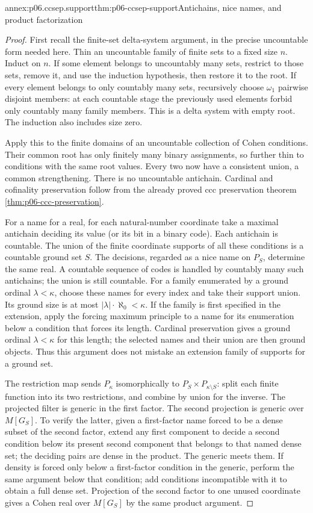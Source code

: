 \begin{annexitem}{annex:p06.ccsep.support}{thm:p06-ccsep-support}{Antichains, nice names, and product factorization}
\begin{proof}
First recall the finite-set delta-system argument, in the precise
uncountable form needed here. Thin an uncountable family of finite
sets to a fixed size \(n\). Induct on \(n\). If some element
belongs to uncountably many sets, restrict to those sets, remove it,
and use the induction hypothesis, then restore it to the root.
If every element belongs to only countably many sets, recursively
choose \(\omega_1\) pairwise disjoint members: at each countable
stage the previously used elements forbid only countably many family
members. This is a delta system with empty root. The induction
also includes size zero.

Apply this to the finite domains of an uncountable collection of
Cohen conditions. Their common root has only finitely many binary
assignments, so further thin to conditions with the same root values.
Every two now have a consistent union, a common strengthening. There
is no uncountable antichain. Cardinal and cofinality preservation
follow from the already proved ccc preservation theorem
\cref{thm:p06-ccc-preservation}.

For a name for a real, for each natural-number coordinate take a
maximal antichain deciding its value (or its bit in a binary code).
Each antichain is countable. The union of the finite coordinate
supports of all these conditions is a countable ground set \(S\).
The decisions, regarded as a nice name on \(P_S\), determine the
same real. A countable sequence of codes is handled by countably
many such antichains; the union is still countable. For a family
enumerated by a ground ordinal \(\lambda<\kappa\), choose these
names for every index and take their support union. Its ground
size is at most \(|\lambda|\cdot\aleph_0<\kappa\). If the
family is first specified in the extension, apply the forcing
maximum principle to a name for its enumeration below a condition
that forces its length. Cardinal preservation gives a ground
ordinal \(\lambda<\kappa\) for this length; the selected names and
their union are then ground objects. Thus this argument does not
mistake an extension family of supports for a ground set.

The restriction map sends \(P_\kappa\) isomorphically to
\(P_S\times P_{\kappa\setminus S}\): split each finite function
into its two restrictions, and combine by union for the inverse.
The projected filter is generic in the first factor. The second
projection is generic over \(M[G_S]\). To verify the latter,
given a first-factor name forced to be a dense subset of the second
factor, extend any first component to decide a second condition
below its present second component that belongs to that named dense
set; the deciding pairs are dense in the product. The generic meets
them. If density is forced only below a first-factor condition in
the generic, perform the same argument below that condition; add
conditions incompatible with it to obtain a full dense set.
Projection of the second factor to one unused coordinate gives a
Cohen real over \(M[G_S]\) by the same product argument.


\end{proof}
\end{annexitem}
